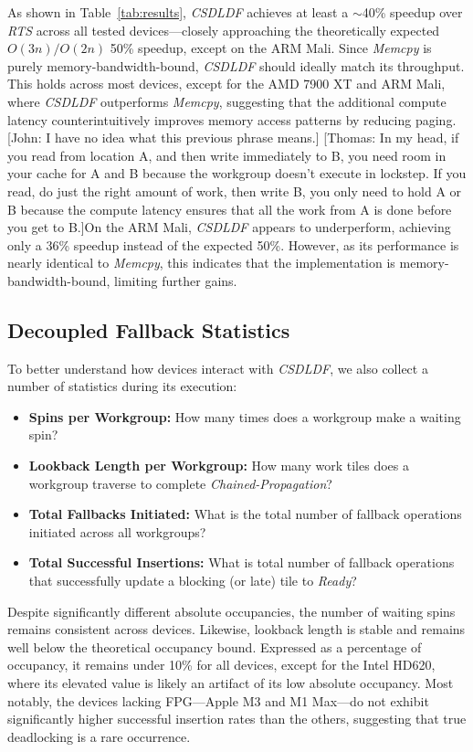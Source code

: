 \documentclass[sigconf]{acmart}
\newcommand{\thomas}[1]{{\footnotesize\color{orange}[Thomas: #1]}}
\newcommand{\john}[1]{{\footnotesize\color{cyan}[John: #1]}}
\begin{document}
As shown in Table~\ref{tab:results}, \emph{CSDLDF} achieves at least a $\sim$40\% speedup over \emph{RTS} across all tested devices—closely approaching the theoretically expected $O(3n)/O(2n)$ 50\% speedup, except on the ARM Mali. Since \emph{Memcpy} is purely memory-bandwidth-bound, \emph{CSDLDF} should ideally match its throughput. This holds across most devices, except for the AMD 7900 XT and ARM Mali, where \emph{CSDLDF} outperforms \emph{Memcpy}, suggesting that the additional compute latency counterintuitively improves memory access patterns by reducing paging. \john{I have no idea what this previous phrase means.} \thomas{In my head, if you read from location A, and then write immediately to B, you need room in your cache for A and B because the workgroup doesn't execute in lockstep. If you read, do just the right amount of work, then write B, you only need to hold A or B because the compute latency ensures that all the work from A is done before you get to B.}On the ARM Mali, \emph{CSDLDF} appears to underperform, achieving only a 36\% speedup instead of the expected 50\%. However, as its performance is nearly identical to \emph{Memcpy}, this indicates that the implementation is memory-bandwidth-bound, limiting further gains.

\subsection{Decoupled Fallback Statistics}
To better understand how devices interact with \emph{CSDLDF}, we also collect a number of statistics during its execution:
\begin{itemize}
  \item \textbf{Spins per Workgroup:} How many times does a workgroup make a waiting spin?
  \item \textbf{Lookback Length per Workgroup:} How many work tiles does a workgroup traverse to complete \emph{Chained-Propagation}?
  \item \textbf{Total Fallbacks Initiated:} What is the total number of fallback operations initiated across all workgroups?
  \item \textbf{Total Successful Insertions:} What is total number of fallback operations that successfully update a blocking (or late) tile to \emph{Ready}?
\end{itemize}
Despite significantly different absolute occupancies, the number of waiting spins remains consistent across devices. Likewise, lookback length is stable and remains well below the theoretical occupancy bound. Expressed as a percentage of occupancy, it remains under 10\% for all devices, except for the Intel HD620, where its elevated value is likely an artifact of its low absolute occupancy. Most notably, the devices lacking FPG---Apple M3 and M1 Max---do not exhibit significantly higher successful insertion rates than the others, suggesting that true deadlocking is a rare occurrence.
\end{document}
